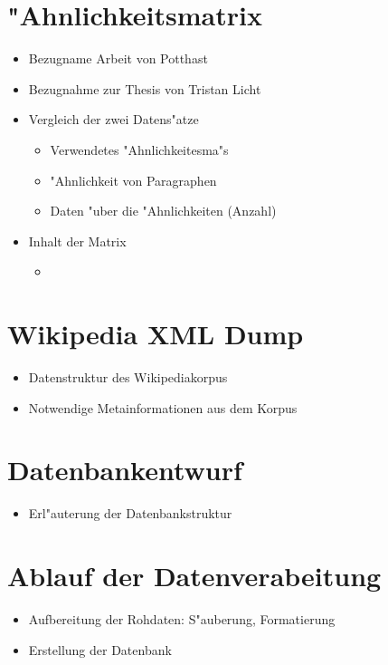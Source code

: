 

\section{"Ahnlichkeitsmatrix}
\begin{itemize}
    \item Bezugname Arbeit von Potthast
    \item Bezugnahme zur Thesis von Tristan Licht
    \item Vergleich der zwei Datens"atze

    \begin{itemize}
      \item Verwendetes "Ahnlichkeitesma"s
      \item "Ahnlichkeit von Paragraphen
      \item Daten "uber die "Ahnlichkeiten (Anzahl)
    \end{itemize}
    \item Inhalt der Matrix
    \begin{itemize}
      \item
    \end{itemize}

\end{itemize}

\section{Wikipedia XML Dump}
\begin{itemize}
    \item Datenstruktur des Wikipediakorpus
    \item Notwendige Metainformationen aus dem Korpus
\end{itemize}



\section{Datenbankentwurf}
\begin{itemize}
    \item Erl"auterung der Datenbankstruktur
\end{itemize}


\section{Ablauf der Datenverabeitung}
\begin{itemize}
    \item Aufbereitung der Rohdaten: S"auberung, Formatierung
    \item Erstellung der Datenbank
\end{itemize}
